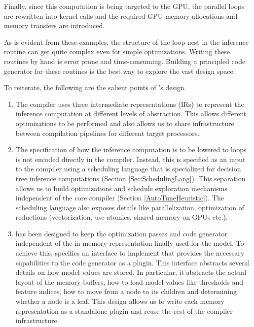 Finally, since this computation is being targeted to the GPU, the 
parallel loops are rewritten into kernel calls and the  required 
GPU memory allocations and memory transfers are introduced.

As is evident from these examples, the structure of the loop 
nest in the inference routine can get quite complex even 
for simple optimizations. Writing these routines by hand 
is error prone and time-consuming. Building a principled code 
generator for these routines is the best way to explore the
vast design space. 

To reiterate, the following are the salient points of \Treebeard{}'s design.
\begin{enumerate}
  \item The compiler uses three intermediate representations (IRs) to
  represent the inference computation at different levels of abstraction. This
  allows different optimizations to be performed and also allows us to share
  infrastructure between compilation pipelines for different target processors.

  \item The specification of how the inference computation is to be lowered to 
  loops is not encoded directly in the compiler. Instead, this 
  is specified as an input to the compiler using a scheduling language that is 
  specialized for decision tree inference computations (Section \ref{Sec:SchedulingLang}).
  This separation allows us to build optimizations and schedule exploration 
  mechanisms independent of the core compiler (Section \ref{AutoTuneHeuristic}). 
  The scheduling language also exposes details like parallelization, optimization
  of reductions (vectorization, use atomics, shared memory on GPUs etc.).

  \item \Treebeard{} has been designed to keep the optimization passes and code 
  generator independent of the in-memory representation finally used for the model. To achieve 
  this, \Treebeard{} specifies an interface to implement that provides the necessary 
  capabilities to the code generator as a plugin. This interface abstracts several details
  on how model values are stored. In particular, it abstracts the actual layout of 
  the memory buffers, how to load model values like thresholds and feature indices, how 
  to move from a node to its children and determining whether a node is a leaf.
  This design allows us to write each memory representation as a standalone plugin 
  and reuse the rest of the compiler infrastructure.
\end{enumerate}


